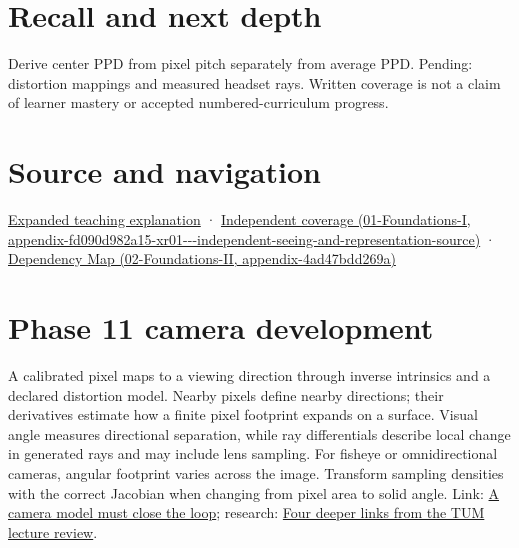 \section{Recall and next depth}\label{appendix-7d356c396d1a-recall-and-next-depth}

Derive center PPD from pixel pitch separately from average PPD. Pending: distortion mappings and measured headset rays. Written coverage is not a claim of learner mastery or accepted numbered-curriculum progress.

\section{Source and navigation}\label{appendix-7d356c396d1a-source-and-navigation}

\href{Continuous\%20Notes/University\%20-\%20Worlds,\%20Images\%20and\%20Inference\%20-\%20Graphics,\%20Vision\%20and\%20Photography\#Angles\%20connect\%20display\%20samples\%20to\%20a\%20viewer}{Expanded teaching explanation} · \href{../01-Foundations-I/main.pdf\#nameddest=appendix-fd090d982a15-xr01---independent-seeing-and-representation-source}{Independent coverage (01-Foundations-I, appendix-fd090d982a15-xr01-\/-\/-independent-seeing-and-representation-source)} · \href{../02-Foundations-II/main.pdf\#nameddest=appendix-4ad47bdd269a}{Dependency Map (02-Foundations-II, appendix-4ad47bdd269a)}

\section{Phase 11 camera development}\label{appendix-7d356c396d1a-phase-11-camera-development}

A calibrated pixel maps to a viewing direction through inverse intrinsics and a declared distortion model. Nearby pixels define nearby directions; their derivatives estimate how a finite pixel footprint expands on a surface. Visual angle measures directional separation, while ray differentials describe local change in generated rays and may include lens sampling. For fisheye or omnidirectional cameras, angular footprint varies across the image. Transform sampling densities with the correct Jacobian when changing from pixel area to solid angle. Link: \href{Continuous\%20Notes/Computing\%20Foundations\%20-\%20From\%20Bits\%20to\%20C++\%20and\%20Systems\%20APIs\#A\%20camera\%20model\%20must\%20close\%20the\%20loop}{A camera model must close the loop}; research: \href{Continuous\%20Notes/Computing\%20Foundations\%20-\%20From\%20Bits\%20to\%20C++\%20and\%20Systems\%20APIs\#Four\%20deeper\%20links\%20from\%20the\%20TUM\%20lecture\%20review}{Four deeper links from the TUM lecture review}.
